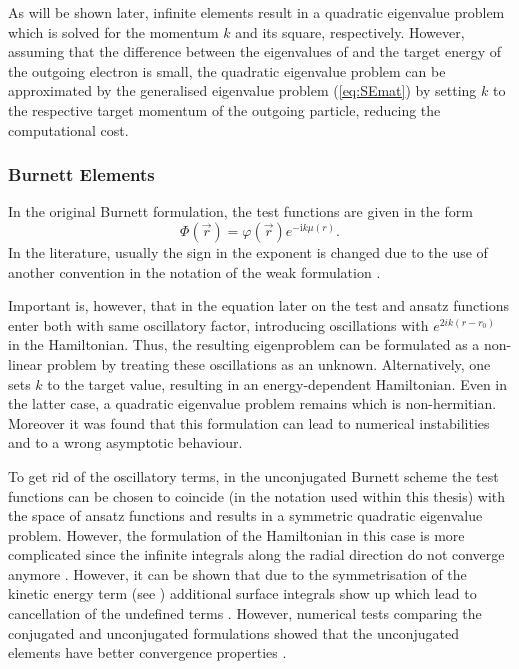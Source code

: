 As will be shown later, infinite elements result in a quadratic eigenvalue problem which is solved for the momentum $k$ and its square, respectively.
However, assuming that the difference between the eigenvalues of  and the target energy of the outgoing electron is small, the quadratic eigenvalue problem can be approximated by the generalised eigenvalue problem (\ref{eq:SEmat}) by setting $k$ to the respective target momentum of the outgoing particle, reducing the computational cost.

\subsubsection{Burnett Elements}
In the original Burnett formulation, the test functions are given in the form
\begin{equation} \label{eq:BUelem}
 \Phi(\vec{r}) = \varphi(\vec{r}) e^{-\text{i}k\mu(r)}.
\end{equation}
In the literature, usually the sign in the exponent is changed due to the use of another convention in the notation of the weak formulation .

Important is, however, that in the equation later on the test and ansatz functions enter both with same oscillatory factor, introducing oscillations with $e^{2ik(r-r_0)}$ in the Hamiltonian.
Thus, the resulting eigenproblem can be formulated as a non-linear problem by treating these oscillations as an unknown.
Alternatively, one sets $k$ to the target value, resulting in an energy-dependent Hamiltonian.
Even in the latter case, a quadratic eigenvalue problem remains which is non-hermitian.
Moreover it was found that this formulation can lead to numerical instabilities \cite{Astley} and to a wrong asymptotic behaviour.

To get rid of the oscillatory terms, in the unconjugated Burnett scheme the test functions can be chosen to coincide (in the notation used within this thesis) with the space of ansatz functions  and results in a symmetric quadratic eigenvalue problem.
However, the formulation of the Hamiltonian in this case is more complicated since the infinite integrals along the radial direction do not converge anymore \cite{Astley,gerdes}.
However, it can be shown that due to the symmetrisation of the kinetic energy term (see ) additional surface integrals show up which lead to cancellation of the undefined terms \cite{gerdes}.
However, numerical tests comparing the conjugated and unconjugated formulations showed that the unconjugated elements  have better convergence properties \cite{gerdes}.
%

